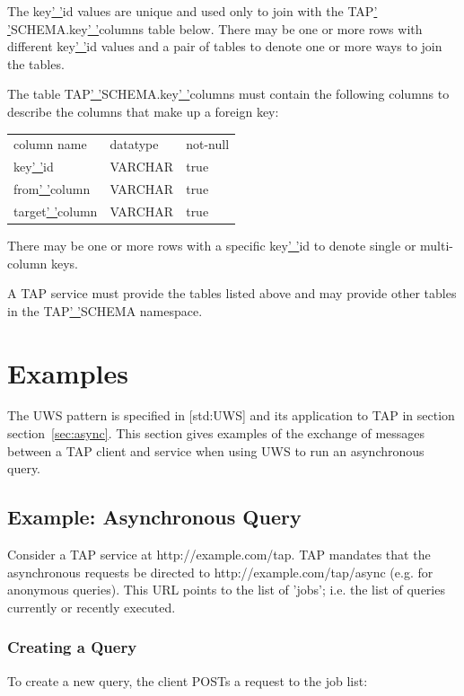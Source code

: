 \documentclass[11pt,letter]{ivoa}
\begin{document}
{The key\underline{' '}id values are unique and used only to join with the 
TAP\underline{' '}SCHEMA.key\underline{' '}columns table below. There may be 
one or more rows with different key\underline{' '}id values and a pair 
of tables to denote one or more ways to join the tables.

The table TAP\underline{' '}SCHEMA.key\underline{' '}columns must contain the 
following columns to describe the columns that make up a foreign key:

\begin{tabular}{l l l}
\label{tab:tap-schema-key-columns}
column name & datatype & not-null \\
key\underline{' '}id & VARCHAR & true \\
from\underline{' '}column & VARCHAR & true \\
target\underline{' '}column & VARCHAR & true \\
\end{tabular}

There may be one or more rows with a specific key\underline{' '}id to 
denote single or multi-column keys.

A TAP service must provide the tables listed above and may provide other tables 
in the TAP\underline{' '}SCHEMA namespace.


\section{Examples}
\label{sec:examples}

The UWS pattern is specified in [std:UWS] and its application to TAP in section 
section~\ref{sec:async}. This section gives examples of the exchange of messages between a 
TAP client and service when using UWS to run an asynchronous query.

\subsection{Example: Asynchronous Query}
Consider a TAP service at http://example.com/tap. TAP mandates that the 
asynchronous requests be directed to http://example.com/tap/async (e.g. for 
anonymous queries). This URL points to the list of 'jobs'; i.e. the list of 
queries currently or recently executed.

\subsubsection{Creating a Query}
To create a new query, the client POSTs a request to the job list:

}
\end{document}
